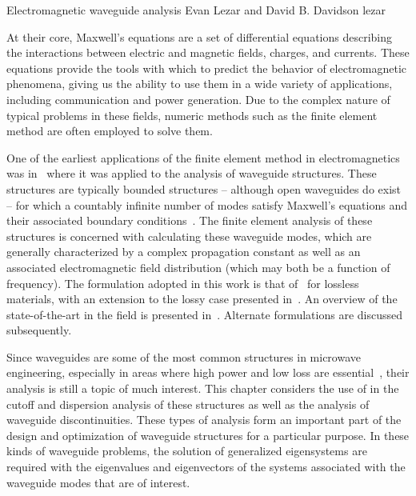               {Electromagnetic waveguide analysis}
              {Evan Lezar and David B. Davidson}
              {lezar}


At their core, Maxwell's equations are
a set of differential equations describing the interactions between
electric and magnetic fields, charges, and currents. These equations
provide the tools with which to predict the behavior of electromagnetic
phenomena, giving us the ability to use them
in a wide variety of applications, including communication and power
generation. Due to the complex nature of typical problems in these fields,
numeric methods such as the finite element method are often employed to
solve them.

One of the earliest applications of the finite element method in
electromagnetics was in~\citet{Silvester1969} where it was applied to
the analysis of waveguide structures. These structures
are typically bounded structures -- although open waveguides do exist --
for which a countably infinite number of modes satisfy Maxwell's equations
and their associated boundary conditions~\citep{Pozar2005}. The finite
element analysis of these structures is concerned with calculating
these waveguide modes, which are generally characterized by a
complex propagation constant as well as an associated electromagnetic
field distribution (which may both be a function of frequency). The
formulation adopted in this work is that of~\citet{LeeSunCendes1991}
for lossless materials, with an extension to the lossy case presented
in~\citet{Lee1994}. An overview of the state-of-the-art in the field is
presented in~\citet{Davidson2011}. Alternate formulations are discussed
subsequently.

Since waveguides are some of the most common structures in microwave
engineering, especially in areas where high power and low loss are
essential~\citep{Pozar2005}, their analysis is still a topic of much
interest. This chapter considers the use of \fenics{} in the cutoff
and dispersion analysis of these structures as well as the analysis of
waveguide discontinuities. These types of analysis form an important part
of the design and optimization of waveguide structures for a particular
purpose. In these kinds of waveguide problems, the solution of generalized
eigensystems are required with the eigenvalues and eigenvectors of the
systems associated with the waveguide modes that are of interest.

